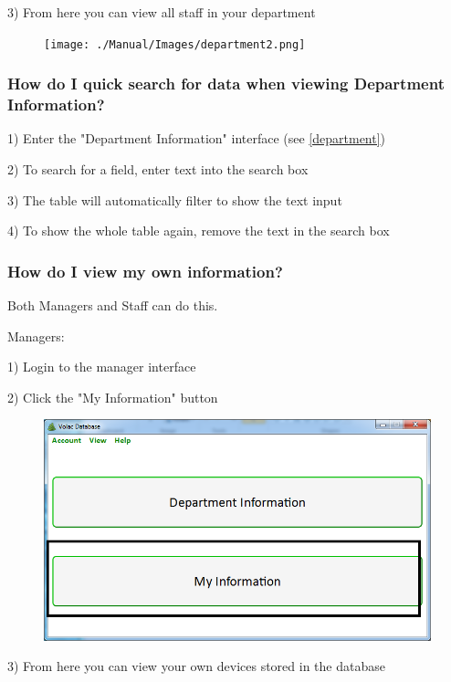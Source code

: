 3) From here you can view all staff in your department

\begin{figure}[H]
    \texttt{[image: ./Manual/Images/department2.png]}
\end{figure}

\subsubsection{How do I quick search for data when viewing Department Information?}

1) Enter the "Department Information" interface (see \ref{department})

2) To search for a field, enter text into the search box 

3) The table will automatically filter to show the text input

4) To show the whole table again, remove the text in the search box

\subsubsection{How do I view my own information?}

Both Managers and Staff can do this.

Managers:

1) Login to the manager interface

2) Click the "My Information" button 

\begin{figure}[H]
    \includegraphics[width=\textwidth]{./Manual/Images/myinfo.png}
\end{figure}

3) From here you can view your own devices stored in the database

